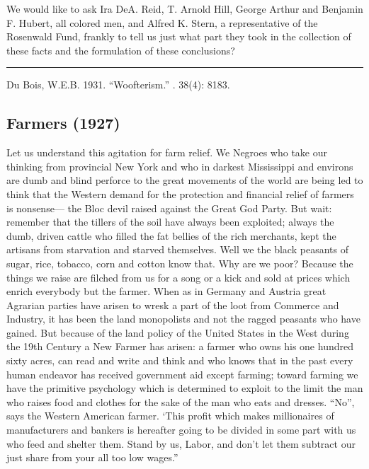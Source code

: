 \documentclass[letterpaper,10pt,english]{jupyterBook}
\begin{document}
\sphinxAtStartPar
We would like to ask Ira DeA. Reid, T. Arnold Hill, George Arthur and Benjamin F. Hubert, all colored men, and Alfred K. Stern, a representative of the Rosenwald Fund, frankly to tell us just what part they took in the collection of these facts and the formulation of these conclusions?


\bigskip\hrule\bigskip


\sphinxAtStartPar
{} Du Bois, W.E.B. 1931. “Woofterism.” . 38(4): 81\sphinxhyphen{}83.


\subsection{Farmers (1927)}
\label{\detokenize{Volumes/34/02/farmers:farmers-1927}}\label{\detokenize{Volumes/34/02/farmers::doc}}
\sphinxAtStartPar
Let us understand this agitation for farm relief. We Negroes who take our thinking from provincial New York and who in darkest Mississippi and environs are dumb and blind perforce to the great movements of the world are being led to think that the Western demand for the protection and financial relief of farmers is nonsense— the Bloc devil raised against the Great God Party. But wait: remember that the tillers of the soil have always been exploited; always the dumb, driven cattle who filled the fat bellies of the rich merchants, kept the artisans from starvation and starved themselves. Well we the black peasants of sugar, rice, tobacco, corn and cotton know that. Why are we poor? Because the things we raise are filched from us for a song or a kick and sold at prices which enrich everybody but the farmer. When as in Germany and Austria great Agrarian parties have arisen to wresk a part of the loot from Commerce and Industry, it has been the land monopolists and not the ragged peasants who have gained. But because of the land policy of the United States in the West during the 19th Century a New Farmer has arisen: a farmer who owns his one hundred sixty acres, can read and write and think and who knows that in the past every human endeavor has received government aid except farming; toward farming we have the primitive psychology which is determined to exploit to the limit the man who raises food and clothes for the sake of the man who eats and dresses. “No”, says the Western American farmer. ‘This profit which makes millionaires of manufacturers and bankers is hereafter going to be divided in some part with us who feed and shelter them. Stand by us, Labor, and don’t let them subtract our just share from your all too low wages.”
\end{document}
